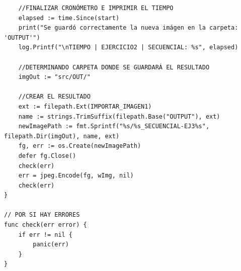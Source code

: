 \documentclass{article}
\begin{document}
\begin{verbatim}
	//FINALIZAR CRONÓMETRO E IMPRIMIR EL TIEMPO
	elapsed := time.Since(start)
	print("Se guardó correctamente la nueva imágen en la carpeta: 'OUTPUT'")
	log.Printf("\nTIEMPO | EJERCICIO2 | SECUENCIAL: %s", elapsed)

	//DETERMINANDO CARPETA DONDE SE GUARDARÁ EL RESULTADO
	imgOut := "src/OUT/"

	//CREAR EL RESULTADO
	ext := filepath.Ext(IMPORTAR_IMAGEN1)
	name := strings.TrimSuffix(filepath.Base("OUTPUT"), ext)
	newImagePath := fmt.Sprintf("%s/%s_SECUENCIAL-EJ3%s", filepath.Dir(imgOut), name, ext)
	fg, err := os.Create(newImagePath)
	defer fg.Close()
	check(err)
	err = jpeg.Encode(fg, wImg, nil)
	check(err)
}

// POR SI HAY ERRORES
func check(err error) {
	if err != nil {
		panic(err)
	}
}

\end{verbatim}
\end{document}
